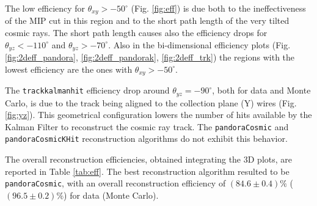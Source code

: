 \documentclass[a4paper]{scrartcl}
\begin{document}
The low efficiency for $\theta_{xy} > -50^{\circ}$ (Fig. \ref{fig:eff}) is due both to the ineffectiveness of the MIP cut in this region and to the short path length of the very tilted cosmic rays. The short path length causes also the efficiency drops for $\theta_{yz} < -110^{\circ}$ and $\theta_{yz} > -70^{\circ}$. Also in the bi-dimensional efficiency plots (Fig. \ref{fig:2deff_pandora}, \ref{fig:2deff_pandorak}, \ref{fig:2deff_trk}) the regions with the lowest efficiency are the ones with $\theta_{xy} > -50^{\circ}$.

The \texttt{track\-kal\-man\-hit} efficiency drop around $\theta_{yz}=-90^{\circ}$, both for data and Monte Carlo, is due to the track being aligned to the collection plane (Y) wires (Fig. \ref{fig:yz}). This geometrical configuration lowers the number of hits available by the Kalman Filter to reconstruct the cosmic ray track. The  \texttt{pan\-do\-ra\-Co\-smic} and \texttt{pan\-do\-ra\-Co\-smic\-KHit} reconstruction algorithms do not exhibit this behavior.


The overall reconstruction efficiencies, obtained integrating the 3D plots, are reported in Table \ref{tab:eff}. The best reconstruction algorithm resulted to be \texttt{pan\-do\-ra\-Co\-smic}, with an overall reconstruction efficiency of $(84.6\pm0.4)\%$ ($(96.5\pm0.2)\%$) for data (Monte Carlo).



\end{document}
